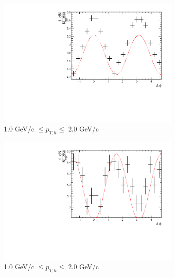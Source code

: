 \begin{figure}[htbp]
\begin{subfigure}{0.5\textwidth}
		\includegraphics[width=\textwidth]{Plots/Correlations/EP/raw/NPE_eh_corr_raw_inplane_primpt_4_5_cent_2_5_assopt_2_2.pdf}
		\caption{1.0 GeV/c $\leq p_{T,h} \leq$ 2.0 GeV/c}
		\label{fig:EP_corr_raw_c}
	\end{subfigure}	
	\begin{subfigure}{0.5\textwidth}
		\includegraphics[width=\textwidth]{Plots/Correlations/EP/raw/NPE_eh_corr_raw_outofplane_primpt_4_5_cent_2_5_assopt_2_2.pdf}
		\caption{1.0 GeV/c $\leq p_{T,h} \leq$ 2.0 GeV/c}
		\label{fig:EP_corr_raw_d}
	\end{subfigure}	
	\begin{subfigure}{0.5\textwidth}

\end{subfigure}
\end{figure}
